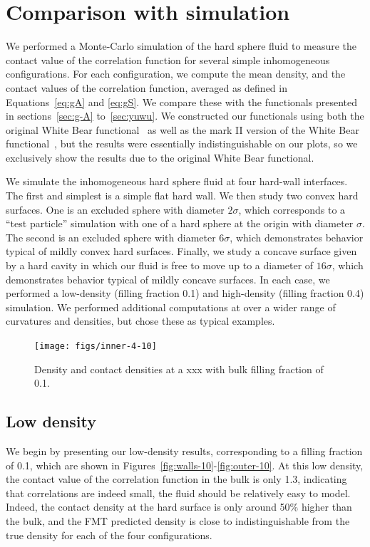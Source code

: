 \documentclass[letterpaper,twocolumn,amsmath,amssymb,jcp,10pt,aip]{revtex4-1}
\begin{document}
\section{Comparison with simulation}\label{sec:simulation}

We performed a Monte-Carlo simulation of the hard sphere fluid to
measure the contact value of the correlation function for several
simple inhomogeneous configurations.  For each configuration, we
compute the mean density, and the contact values of the correlation
function, averaged as defined in Equations~\ref{eq:gA} and
\ref{eq:gS}.  We compare these with the functionals presented in
sections~\ref{sec:g-A} to~\ref{sec:yuwu}.  We constructed our
functionals using both the original White Bear
functional~\cite{roth2002whitebear} as well as the mark II version of
the White Bear functional~\cite{hansen2006density}, but the results
were essentially indistinguishable on our plots, so we exclusively
show the results due to the original White Bear functional.

We simulate the inhomogeneous hard sphere fluid at four hard-wall
interfaces.  The first and simplest is a simple flat hard wall.  We
then study two convex hard surfaces.  One is an excluded sphere with
diameter $2\sigma$, which corresponds to a ``test particle''
simulation with one of a hard sphere at the origin with diameter
$\sigma$.  The second is an excluded sphere with diameter $6\sigma$,
which demonstrates behavior typical of mildly convex hard surfaces.
Finally, we study a concave surface given by a hard cavity in which
our fluid is free to move up to a diameter of $16\sigma$, which
demonstrates behavior typical of mildly concave surfaces.  In each
case, we performed a low-density (filling fraction 0.1) and high-density
(filling fraction 0.4) simulation.  We performed additional
computations at over a wider range of curvatures and densities, but
chose these as typical examples.


\begin{figure}
  \texttt{[image: figs/inner-4-10]}
  \caption{Density and contact densities at a xxx with bulk filling
    fraction of 0.1.}
  \label{fig:inner-4-10}
\end{figure}

\subsection{Low density}

We begin by presenting our low-density results, corresponding to a
filling fraction of 0.1, which are shown in
Figures~\ref{fig:walls-10}-\ref{fig:outer-10}.  At this low density,
the contact value of the correlation function in the bulk is only 1.3,
indicating that correlations are indeed small, the fluid should be
relatively easy to model.  Indeed, the contact density at the hard
surface is only around 50\% higher than the bulk, and the FMT
predicted density is close to indistinguishable from the true
density for each of the four configurations.
\end{document}
